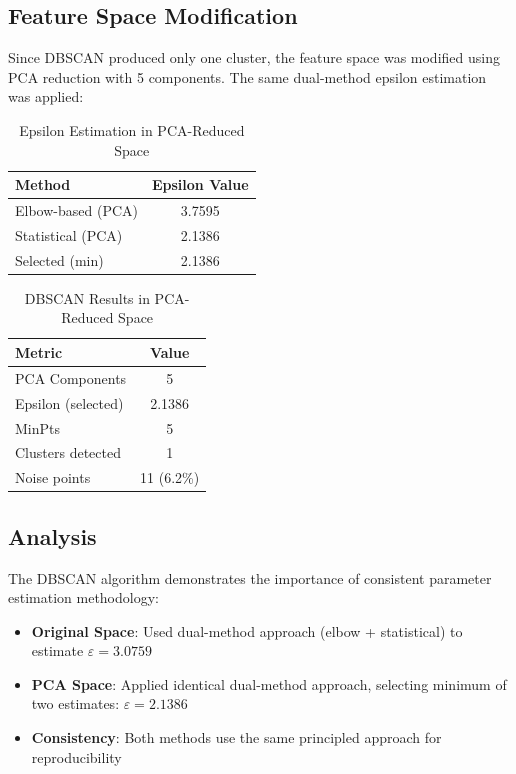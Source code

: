 \documentclass[12pt,a4paper]{article}
\begin{document}
\subsection{Feature Space Modification}

Since DBSCAN produced only one cluster, the feature space was modified using PCA reduction with 5 components. The same dual-method epsilon estimation was applied:

\begin{table}[H]
\centering
\caption{Epsilon Estimation in PCA-Reduced Space}
\begin{tabular}{lc}
\toprule
\textbf{Method} & \textbf{Epsilon Value} \\
\midrule
Elbow-based (PCA) & 3.7595 \\
Statistical (PCA) & 2.1386 \\
Selected (min) & 2.1386 \\
\bottomrule
\end{tabular}
\end{table}

\begin{table}[H]
\centering
\caption{DBSCAN Results in PCA-Reduced Space}
\begin{tabular}{lc}
\toprule
\textbf{Metric} & \textbf{Value} \\
\midrule
PCA Components & 5 \\
Epsilon (selected) & 2.1386 \\
MinPts & 5 \\
Clusters detected & 1 \\
Noise points & 11 (6.2\%) \\
\bottomrule
\end{tabular}
\end{table}

\subsection{Analysis}

The DBSCAN algorithm demonstrates the importance of consistent parameter estimation methodology:

\begin{itemize}
    \item \textbf{Original Space}: Used dual-method approach (elbow + statistical) to estimate $\varepsilon = 3.0759$
    \item \textbf{PCA Space}: Applied identical dual-method approach, selecting minimum of two estimates: $\varepsilon = 2.1386$
    \item \textbf{Consistency}: Both methods use the same principled approach for reproducibility
\end{itemize}
\end{document}
